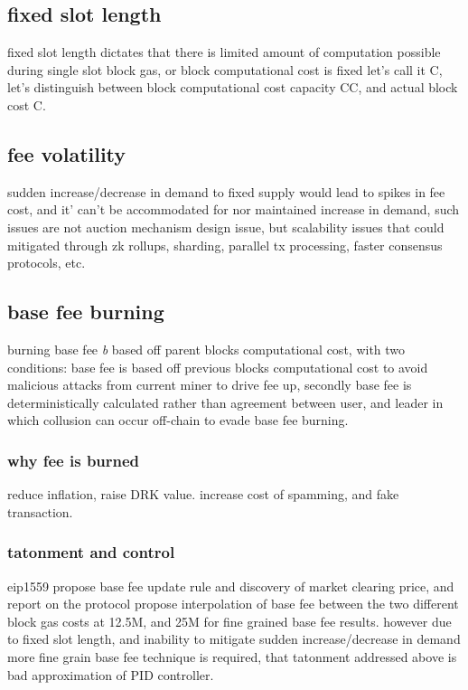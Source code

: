 \documentclass{article}
\begin{document}
\subsection{ fixed slot length}
fixed slot length dictates that there is limited amount of computation possible during single slot block gas, or block computational cost is fixed let's call it C, let's distinguish between block computational cost capacity CC, and actual block cost C.

\subsection{fee volatility}
sudden increase/decrease in demand to fixed supply would lead to spikes in fee cost, and it' can't be accommodated for nor maintained increase in demand, such issues are not auction mechanism design issue, but scalability issues that could mitigated through zk rollups, sharding, parallel tx processing, faster consensus protocols, etc.

\subsection{ base fee burning}
burning base fee \emph{b} based off parent blocks computational cost, with two conditions: base fee is based off previous blocks computational cost to avoid malicious attacks from current miner to drive fee up, secondly base fee is deterministically calculated rather than agreement between user, and leader in which collusion can occur off-chain to evade base fee burning.

\subsubsection{ why fee is burned}
reduce inflation, raise DRK value.
increase cost of spamming, and fake transaction.

\subsubsection{ tatonment and control}
eip1559 \cite{eip1559} propose base fee update rule and discovery of market clearing price, and report on the protocol \cite{eip1559_report} propose interpolation of base fee between the two different block gas costs at 12.5M, and 25M for fine grained base fee results.
however due to fixed slot length, and inability to mitigate sudden increase/decrease in demand more fine grain base fee technique is required, that tatonment addressed above is bad approximation of PID controller.
\end{document}
